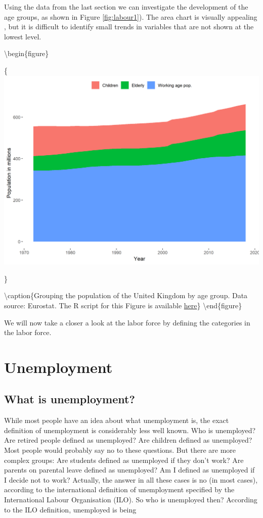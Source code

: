 \documentclass[]{book}
\begin{document}
Using the data from the last section we can investigate the development of the age groups, as shown in Figure \ref{fig:labour1}). The area chart is visually appealing , but it is difficult to identify small trends in variables that are not shown at the lowest level.

\textbackslash begin\{figure\}

\{\centering \includegraphics[width=0.7\linewidth]{_resources/chapter_labour/fig13}

\}

\textbackslash caption\{Grouping the population of the United Kingdom by age group. Data source: Eurostat. The R script for this Figure is available \href{https://www.hhsievertsen.net/economicdata/notes/lecture12/rmaterial/lecnote_12_script_for_fig7.R}{here}\}\label{fig:labour1}
\textbackslash end\{figure\}

We will now take a closer a look at the labor force by defining the categories in the labor force.

\hypertarget{unemployment}{%
\section{Unemployment}\label{unemployment}}

\hypertarget{what-is-unemployment}{%
\subsection{What is unemployment?}\label{what-is-unemployment}}

While most people have an idea about what unemployment is, the exact definition of unemployment is considerably less well known. Who is unemployed? Are retired people defined as unemployed? Are children defined as unemployed? Most people would probably say no to these questions. But there are more complex groups: Are students defined as unemployed if they don't work? Are parents on parental leave defined as unemployed? Am I defined as unemployed if I decide not to work? Actually, the answer in all these cases is no (in most cases), according to the international definition of unemployment specified by the International Labour Organisation (ILO). So who is unemployed then? According to the ILO definition, unemployed is being \citep{ons}
\end{document}
